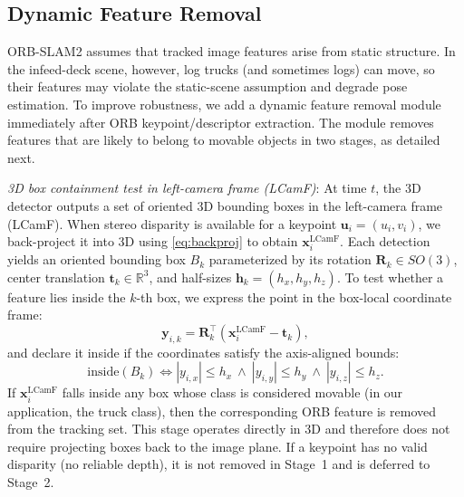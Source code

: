 \documentclass[letterpaper, 10 pt, conference]{IEEEtran}  %
\begin{document}
\subsection{Dynamic Feature Removal}
ORB-SLAM2 assumes that tracked image features arise from static structure. In the infeed-deck scene, however, log trucks (and sometimes logs) can move, so their features may violate the static-scene assumption and degrade pose estimation. To improve robustness, we add a dynamic feature removal module immediately after ORB keypoint/descriptor extraction. The module removes features that are likely to belong to movable objects in two stages, as detailed next.  

 {\it 3D box containment test in left-camera frame (LCamF)}:
At time $t$, the 3D detector outputs a set of oriented 3D bounding boxes in the left-camera frame (LCamF). When stereo disparity is available for a keypoint $\mathbf{u}_i=(u_i,v_i)$, we back-project it into 3D using \eqref{eq:backproj} to obtain $\mathbf{x}^{\mathrm{LCamF}}_i$. Each detection yields an oriented bounding box $B_k$ parameterized by its rotation $\mathbf{R}_k\in SO(3)$, center translation $\mathbf{t}_k\in\mathbb{R}^3$, and half-sizes $\mathbf{h}_k=(h_x,h_y,h_z)$. To test whether a feature lies inside the $k$-th box, we express the point in the box-local coordinate frame:
\begin{equation}
\mathbf{y}_{i,k}=\mathbf{R}_k^\top\left(\mathbf{x}^{\mathrm{LCamF}}_i-\mathbf{t}_k\right),
\end{equation}
and declare it inside if the coordinates satisfy the axis-aligned bounds:
\begin{equation}
\mathrm{inside}(B_k)\Longleftrightarrow
|y_{i,x}|\le h_x \ \wedge\ |y_{i,y}|\le h_y\ \wedge\ |y_{i,z}|\le h_z.
\label{eq:inside}
\end{equation}
If $\mathbf{x}^{\mathrm{LCamF}}_i$ falls inside any box whose class is considered movable (in our application, the truck class), then the corresponding ORB feature is removed from the tracking set. This stage operates directly in 3D and therefore does not require projecting boxes back to the image plane. If a keypoint has no valid disparity (no reliable depth), it is not removed in Stage~1 and is deferred to Stage~2.
\end{document}
